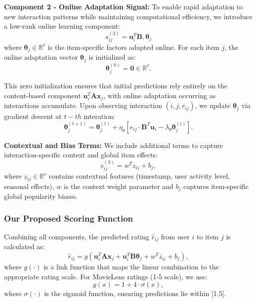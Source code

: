 \documentclass[acmsmall]{acmart}
\begin{document}
\textbf{Component 2 - Online Adaptation Signal:} To enable rapid adaptation to new interaction patterns while maintaining computational efficiency, we introduce a low-rank online learning component:
\begin{equation}
s^{(2)}_{ij} = \mathbf{u}_i^T \mathbf{B},\boldsymbol{\theta}_j
\label{eq:online_component}
\end{equation}
where $\boldsymbol{\theta}_j \in \mathbb{R}^\ell$ is the item-specific factors adapted online. For each item $j$, the online adaptation vector $\boldsymbol{\theta}_j$ is initialized as:
\begin{equation}
\boldsymbol{\theta}_j^{(0)} = \mathbf{0} \in \mathbb{R}^\ell.
\label{eq:theta_initialization}
\end{equation}

This zero initialization ensures that initial predictions rely entirely on the content-based component $\mathbf{u}_i^T \mathbf{A} \mathbf{x}_j$, with online adaptation occurring as interactions accumulate. Upon observing interaction $(i,j,r_{ij})$, we update $\boldsymbol{\theta}_j$ via gradient descent at $t-th$ interation:
\begin{equation}
\boldsymbol{\theta}_j^{(t+1)} = \boldsymbol{\theta}_j^{(t)} + \eta_\theta \left[e_{ij} \cdot \mathbf{B}^T \mathbf{u}_i - \lambda_\theta \boldsymbol{\theta}_j^{(t)}\right].
\label{eq:theta_update}
\end{equation}

\textbf{Contextual and Bias Terms:} We include additional terms to capture interaction-specific context and global item effects:
\begin{equation}
s^{(3)}_{ij} = w^T z_{ij} + b_j,
\label{eq:context_bias}
\end{equation}
where $z_{ij} \in \mathbb{R}^c$ contains contextual features (timestamp, user activity level, seasonal effects), $w$ is the context weight parameter and $b_j$ captures item-specific global popularity biases.

\subsubsection{Our Proposed Scoring Function}

Combining all components, the predicted rating $\hat{r}_{ij}$ from user $i$ to item $j$ is calculated as: 
\begin{equation}
\hat{r}_{ij} = g\left(\mathbf{u}_i^T \mathbf{A} \mathbf{x}_j + \mathbf{u}_i^T \mathbf{B} \boldsymbol{\theta}_j + w^T z_{ij} + b_j\right),
\label{eq:complete_scoring}
\end{equation}
where $g(\cdot)$ is a link function that maps the linear combination to the appropriate rating scale. For MovieLens ratings (1-5 scale), we use:
\begin{equation}
g(x) = 1 + 4 \cdot \sigma(x),
\label{eq:link_function}
\end{equation}
where $\sigma(\cdot)$ is the sigmoid function, ensuring predictions lie within [1,5].
\end{document}
